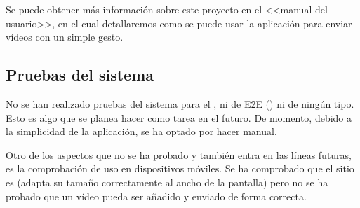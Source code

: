 Se puede obtener más información sobre este proyecto en el <<manual del usuario>>, en el cual detallaremos como se puede usar la aplicación para enviar vídeos con un simple gesto.

\subsection{Pruebas del sistema}

No se han realizado pruebas del sistema para el , ni de E2E () ni de ningún tipo. Esto es algo que se planea hacer como tarea en el futuro. De momento, debido a la simplicidad de la aplicación, se ha optado por hacer  manual.

Otro de los aspectos que no se ha probado y también entra en las líneas futuras, es la comprobación de uso en dispositivos móviles. Se ha comprobado que el sitio es  (adapta su tamaño correctamente al ancho de la pantalla) pero no se ha probado que un vídeo pueda ser añadido y enviado de forma correcta.